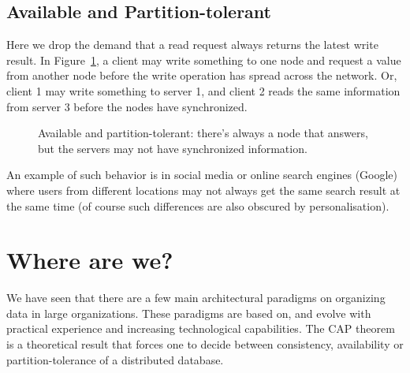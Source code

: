 \subsection{Available and Partition-tolerant}
Here we drop the demand that a read request always returns the latest write
result. In Figure~\ref{fig:ap}, a client may write something to one node and
request a value from another node before the write operation has spread across
the network. Or, client 1 may write something to server 1, and client 2 reads
the same information from server 3 before the nodes have synchronized. 
\begin{figure}[h]
\centering
{}
\caption{Available and partition-tolerant: there's always a node that answers,
but the servers may not have synchronized information.}
\label{fig:ap}
\end{figure}
An example of such behavior is in social media or online search engines
(Google) where users from different locations may not always get the same
search result at the same time (of course such differences are also obscured by
personalisation).



\section*{Where are we?}
We have seen that there are a few main architectural paradigms on organizing
data in large organizations. These paradigms are based on, and evolve with
practical experience and increasing technological capabilities. The CAP theorem
is a theoretical result that forces one to decide between consistency,
availability or partition-tolerance of a distributed database.


